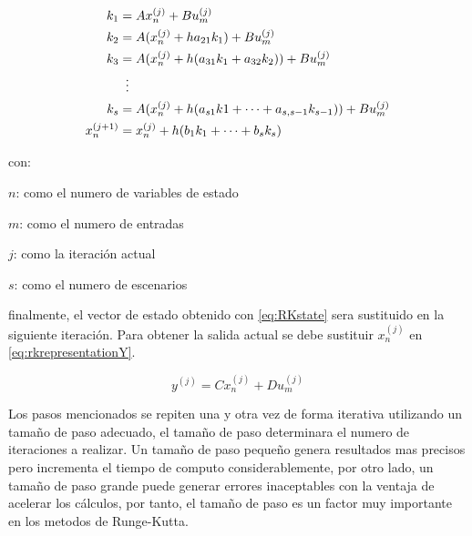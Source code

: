             \begin{equation}\label{eq:RKstate}
                \begin{aligned}
                    k_1 &= Ax_n^{(j)} + Bu_m^{(j)}\\
                    k_2 &= A(x_n^{(j)} +  ha_{21}k_1) + Bu_m^{(j)}\\
                    k_3 &= A(x_n^{(j)} +  h(a_{31}k_1 + a_{32}k_2)) + Bu_m^{(j)}\\
                    &\mathrel{\makebox[\widthof{=}]{\vdots}}\\
                    k_s &= A(x_n^{(j)} + h(a_{s1}k1 + \cdots +  a_{s,s-1}k_{s-1})) + Bu_m^{(j)}\\
                    x_n^{(j+1)} &= x_n^{(j)} + h(b_1 k_1 + \cdots + b_s k_s)
                \end{aligned}
            \end{equation}
            
            \noindent con:

            \begin{spacing}{1.5}
				
				$n$: como el numero de variables de estado
				
				$m$: como el numero de entradas
				
				$j$: como la iteración actual
                
                $s$: como el numero de escenarios
            \end{spacing}

            \noindent finalmente, el vector de estado obtenido con \cref{eq:RKstate} sera sustituido en la siguiente iteración. Para obtener la salida actual se debe sustituir $x_n^{(j)}$  en \cref{eq:rkrepresentationY}. 
            
            \begin{equation}
				y^{(j)} = Cx_n^{(j)} + Du_m^{(j)} \label{eq:rkrepresentationY}
            \end{equation}
            
            Los pasos mencionados se repiten una y otra vez de forma iterativa utilizando un tamaño de paso adecuado, el tamaño de paso determinara el numero de iteraciones a realizar. Un tamaño de paso pequeño genera resultados mas precisos pero incrementa el tiempo de computo considerablemente, por otro lado, un tamaño de paso grande puede generar errores inaceptables con la ventaja de acelerar los cálculos, por tanto, el tamaño de paso es un factor muy importante en los metodos de Runge-Kutta.

